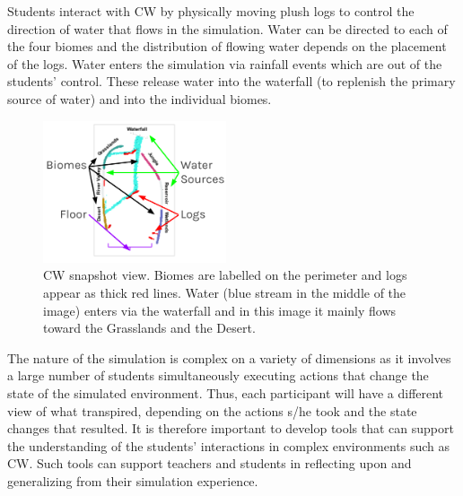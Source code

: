 \documentclass[letterpaper]{article} %
\newcommand{\kibitz}[2]{\ifnum\Comments=1{\textcolor{#1}{#2}}\fi}
\newcommand{\nh}[1]{\kibitz{blue}{[NH:#1]}}
\newcommand{\kg}[1]{\kibitz{red}{[KG:#1]}}
\begin{document}
Students interact with CW by physically moving plush logs to control the direction of water that flows in the simulation. Water can be directed to each of the four biomes and the distribution of flowing water depends on the placement of the logs. Water enters the simulation via rainfall events which are out of the students' control. These release water into the waterfall (to replenish the primary source of water) and into the individual biomes.

\begin{figure}[t]
\centering
\includegraphics[width=0.48\textwidth]{./images/cw_snapshot.png}
\caption{CW snapshot view. Biomes are labelled on the perimeter and logs appear as thick red lines. Water (blue stream in the middle of the image) enters via the waterfall and in this image it mainly flows toward the Grasslands and the Desert.}
\label{fig:connected_worlds_graphic}
\end{figure}

The nature of the simulation is complex on a variety of dimensions as it involves a large number of students simultaneously executing actions that change the state of the simulated environment. Thus, each participant will have a different view of what transpired, depending on the actions s/he took and the state changes that resulted. 
It is therefore important to develop tools that can support  the understanding of the students' interactions in complex environments such as CW. 
Such tools can  support teachers and students in reflecting upon and generalizing from their simulation experience.
\end{document}
